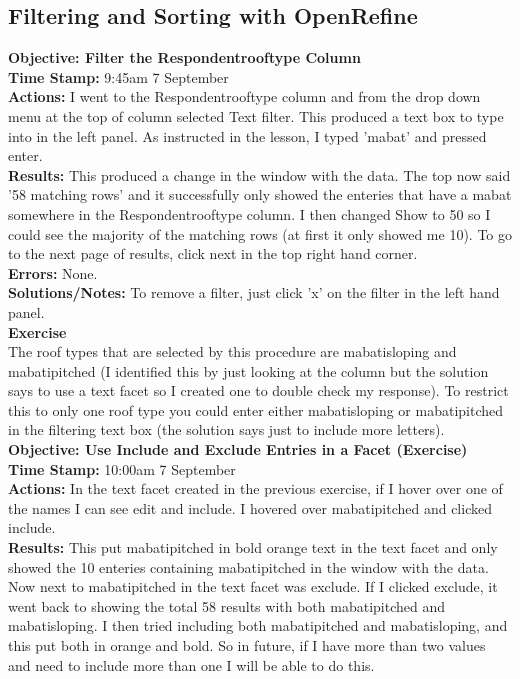 \documentclass{article}
\begin{document}
\begin{FlushLeft}
\subsection{Filtering and Sorting with OpenRefine}
\textbf{Objective: Filter the Respondent\textunderscore roof\textunderscore type Column}\\ 
\textbf{Time Stamp:} 9:45am 7 September\\
\textbf{Actions:} I went to the Respondent\textunderscore roof\textunderscore type column and from the drop down menu at the top of column selected Text filter. This produced a text box to type into in the left panel. As instructed in the lesson, I typed 'mabat' and pressed enter.\\
\textbf{Results:} This produced a change in the window with the data. The top now said '58 matching rows' and it successfully only showed the enteries that have a mabat somewhere in the  Respondent\textunderscore roof\textunderscore type column. I then changed Show to 50 so I could see the majority of the matching rows (at first it only showed me 10). To go to the next page of results, click next in the top right hand corner. \\
\textbf{Errors:} None.\\
\textbf{Solutions/Notes:} To remove a filter, just click 'x' on the filter in the left hand panel.\\
\vspace{5mm}
\textbf{Exercise}\\ 
The roof types that are selected by this procedure are mabatisloping and mabatipitched (I identified this by just looking at the column but the solution says to use a text facet so I created one to double check my response). To restrict this to only one roof type you could enter either mabatisloping or mabatipitched in the filtering text box (the solution says just to include more letters).\\
\vspace{5mm}
\textbf{Objective: Use Include and Exclude Entries in a Facet (Exercise)}\\ 
\textbf{Time Stamp:} 10:00am 7 September\\
\textbf{Actions:} In the text facet created in the previous exercise, if I hover over one of the names I can see edit and include. I hovered over mabatipitched and clicked include.\\
\textbf{Results:} This put mabatipitched in bold orange text in the text facet and only showed the 10 enteries containing mabatipitched in the window with the data. Now next to mabatipitched in the text facet was exclude. If I clicked exclude, it went back to showing the total 58 results with both mabatipitched and mabatisloping. I then tried including both mabatipitched and mabatisloping, and this put both in orange and bold. So in future, if I have more than two values and need to include more than one I will be able to do this. \\

\end{FlushLeft}
\end{document}
